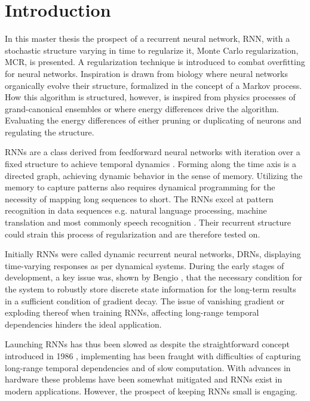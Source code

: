 
\chapter{Introduction}

In this master thesis the prospect of a recurrent neural network, RNN, with a stochastic structure varying in time to regularize it, Monte Carlo regularization, MCR, is presented. A regularization technique is introduced to combat overfitting for neural networks. Inspiration is drawn from biology where neural networks organically evolve their structure, formalized in the concept of a Markov process. How this algorithm is structured, however, is inspired from physics processes of grand-canonical ensembles or where energy differences drive the algorithm. Evaluating the energy differences of either pruning or duplicating of neurons and regulating the structure.

RNNs are a class derived from feedforward neural networks with iteration over a fixed structure to achieve temporal dynamics \cite{DRNNS}. Forming along the time axis is a directed graph, achieving dynamic behavior in the sense of memory. Utilizing the memory to capture patterns also requires dynamical programming for the necessity of mapping long sequences to short. The RNNs excel at pattern recognition in data sequences e.g. natural language processing, machine translation and most commonly speech recognition \cite{handwriting}. Their recurrent structure could strain this process of regularization and are therefore tested on.

Initially RNNs were called dynamic recurrent neural networks, DRNs, displaying time-varying responses as per dynamical systems. During the early stages of development, a key issue was, shown by Bengio \cite{ben}, that the necessary condition for the system to robustly store discrete state information for the long-term results in a sufficient condition of gradient decay. The issue of vanishing gradient \cite{hoch} or exploding thereof when training RNNs, affecting long-range temporal dependencies hinders the ideal application. 

Launching RNNs has thus been slowed as despite the straightforward concept introduced in 1986 \cite{RNN1}, implementing has been fraught with difficulties of capturing long-range temporal dependencies and of slow computation. With advances in hardware these problems have been somewhat mitigated and RNNs exist in modern applications. However, the prospect of keeping RNNs small is engaging.

